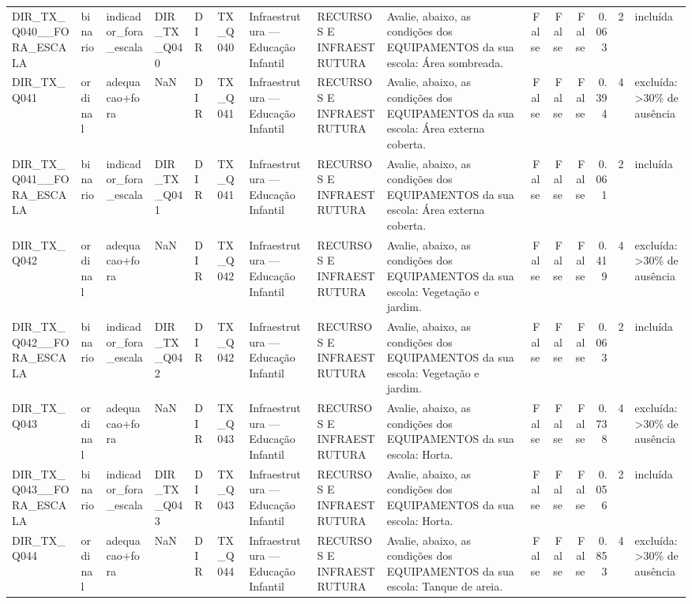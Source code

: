 \begin{tabular}{lllllllllrrrrrl}
DIR\_TX\_Q040\_\_FORA\_ESCALA & binario & indicador\_fora\_escala & DIR\_TX\_Q040 & DIR & TX\_Q040 & Infraestrutura — Educação Infantil & RECURSOS E INFRAESTRUTURA & Avalie, abaixo, as condições dos EQUIPAMENTOS da sua escola: Área sombreada. & False & False & False & 0.063 & 2 & incluída \\
DIR\_TX\_Q041 & ordinal & adequacao+fora & NaN & DIR & TX\_Q041 & Infraestrutura — Educação Infantil & RECURSOS E INFRAESTRUTURA & Avalie, abaixo, as condições dos EQUIPAMENTOS da sua escola: Área externa coberta. & False & False & False & 0.394 & 4 & excluída: >30\% de ausência \\
DIR\_TX\_Q041\_\_FORA\_ESCALA & binario & indicador\_fora\_escala & DIR\_TX\_Q041 & DIR & TX\_Q041 & Infraestrutura — Educação Infantil & RECURSOS E INFRAESTRUTURA & Avalie, abaixo, as condições dos EQUIPAMENTOS da sua escola: Área externa coberta. & False & False & False & 0.061 & 2 & incluída \\
DIR\_TX\_Q042 & ordinal & adequacao+fora & NaN & DIR & TX\_Q042 & Infraestrutura — Educação Infantil & RECURSOS E INFRAESTRUTURA & Avalie, abaixo, as condições dos EQUIPAMENTOS da sua escola: Vegetação e jardim. & False & False & False & 0.419 & 4 & excluída: >30\% de ausência \\
DIR\_TX\_Q042\_\_FORA\_ESCALA & binario & indicador\_fora\_escala & DIR\_TX\_Q042 & DIR & TX\_Q042 & Infraestrutura — Educação Infantil & RECURSOS E INFRAESTRUTURA & Avalie, abaixo, as condições dos EQUIPAMENTOS da sua escola: Vegetação e jardim. & False & False & False & 0.063 & 2 & incluída \\
DIR\_TX\_Q043 & ordinal & adequacao+fora & NaN & DIR & TX\_Q043 & Infraestrutura — Educação Infantil & RECURSOS E INFRAESTRUTURA & Avalie, abaixo, as condições dos EQUIPAMENTOS da sua escola: Horta. & False & False & False & 0.738 & 4 & excluída: >30\% de ausência \\
DIR\_TX\_Q043\_\_FORA\_ESCALA & binario & indicador\_fora\_escala & DIR\_TX\_Q043 & DIR & TX\_Q043 & Infraestrutura — Educação Infantil & RECURSOS E INFRAESTRUTURA & Avalie, abaixo, as condições dos EQUIPAMENTOS da sua escola: Horta. & False & False & False & 0.056 & 2 & incluída \\
DIR\_TX\_Q044 & ordinal & adequacao+fora & NaN & DIR & TX\_Q044 & Infraestrutura — Educação Infantil & RECURSOS E INFRAESTRUTURA & Avalie, abaixo, as condições dos EQUIPAMENTOS da sua escola: Tanque de areia. & False & False & False & 0.853 & 4 & excluída: >30\% de ausência \\

\end{tabular}
